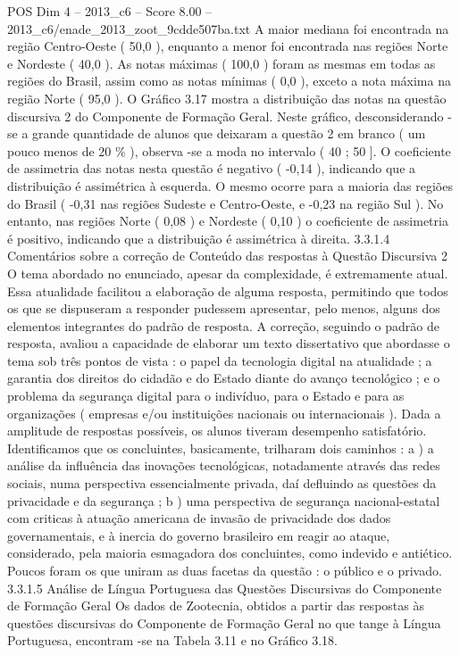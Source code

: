 \begin{textsample}{POS Dim 4 – 2013\_c6 – Score 8.00 – 2013\_c6/enade\_2013\_zoot\_9cdde507ba.txt}
A maior mediana foi encontrada na região Centro-Oeste ( 50,0 ), enquanto a menor foi encontrada nas regiões Norte e Nordeste ( 40,0 ).
As notas máximas ( 100,0 ) foram as mesmas em todas as regiões do Brasil, assim como as notas mínimas ( 0,0 ), exceto a nota máxima na região Norte ( 95,0 ).
O Gráfico 3.17 mostra a distribuição das notas na questão discursiva 2 do Componente de Formação Geral.
Neste gráfico, desconsiderando -se a grande quantidade de alunos que deixaram a questão 2 em branco ( um pouco menos de 20 \% ), observa -se a moda no intervalo ( 40 ; 50 ].
O coeficiente de assimetria das notas nesta questão é negativo ( -0,14 ), indicando que a distribuição é assimétrica à esquerda.
O mesmo ocorre para a maioria das regiões do Brasil ( -0,31 nas regiões Sudeste e Centro-Oeste, e -0,23 na região Sul ).
No entanto, nas regiões Norte ( 0,08 ) e Nordeste ( 0,10 ) o coeficiente de assimetria é positivo, indicando que a distribuição é assimétrica à direita. 3.3.1.4 Comentários sobre a correção de Conteúdo das respostas à Questão Discursiva 2 O tema abordado no enunciado, apesar da complexidade, é extremamente atual.
Essa atualidade facilitou a elaboração de alguma resposta, permitindo que todos os que se dispuseram a responder pudessem apresentar, pelo menos, alguns dos elementos integrantes do padrão de resposta.
A correção, seguindo o padrão de resposta, avaliou a capacidade de elaborar um texto dissertativo que abordasse o tema sob três pontos de vista : o papel da tecnologia digital na atualidade ; a garantia dos direitos do cidadão e do Estado diante do avanço tecnológico ; e o problema da segurança digital para o indivíduo, para o Estado e para as organizações ( empresas e/ou instituições nacionais ou internacionais ).
Dada a amplitude de respostas possíveis, os alunos tiveram desempenho satisfatório.
Identificamos que os concluintes, basicamente, trilharam dois caminhos : a ) a análise da influência das inovações tecnológicas, notadamente através das redes sociais, numa perspectiva essencialmente privada, daí defluindo as questões da privacidade e da segurança ; b ) uma perspectiva de segurança nacional-estatal com criticas à atuação americana de invasão de privacidade dos dados governamentais, e à inercia do governo brasileiro em reagir ao ataque, considerado, pela maioria esmagadora dos concluintes, como indevido e antiético.
Poucos foram os que uniram as duas facetas da questão : o público e o privado. 3.3.1.5 Análise de Língua Portuguesa das Questões Discursivas do Componente de Formação Geral Os dados de Zootecnia, obtidos a partir das respostas às questões discursivas do Componente de Formação Geral no que tange à Língua Portuguesa, encontram -se na Tabela 3.11 e no Gráfico 3.18.

\end{textsample}
